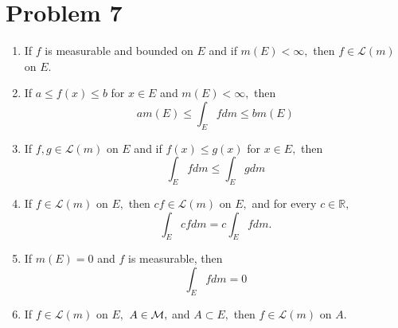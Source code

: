 \documentclass[11pt]{article}
\newcommand{\bbR}{\mathbb{R}}
\begin{document}
\section*{Problem 7}
\begin{problem}
    \begin{enumerate}
        \item If $f$ is measurable and bounded on $E$ and if $m(E) < \infty,$ then $f \in \mathcal{L}(m)$ on $E.$
        \item If $a \leq f(x) \leq b$ for $x \in E$ and $m(E) < \infty,$ then 
        \[a m(E) \leq \int_E f dm \leq bm(E)\]
        \item If $f, g \in \mathcal{L}(m)$ on $E$ and if $f(x) \leq g(x)$ for $x\in E,$ then \[\int_E f dm \leq \int_E g dm\]
        \item If $f \in \mathcal{L}(m)$ on $E,$ then $cf \in \mathcal{L}(m)$ on $E,$ and for every $c\in \bbR,$ 
        \[\int_E cf dm = c\int_E fdm.\]
        \item If $m(E) = 0$ and $f$ is measurable, then 
        \[\int_E f dm = 0\]
        \item If $f \in \mathcal{L}(m)$ on $E,$ $A\in \cal M,$ and $A\subset E,$ then $f \in \mathcal{L}(m)$ on $A.$ 
    \end{enumerate}
\end{problem}
\end{document}
